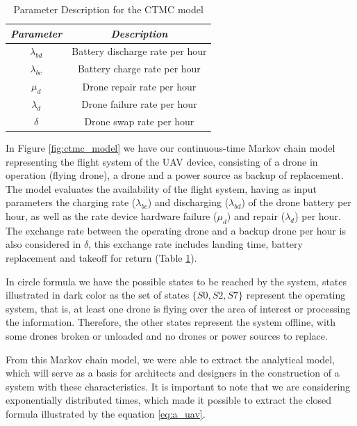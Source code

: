 \documentclass[conference]{IEEEtran}
\begin{document}
\begin{table}[htbp]
\caption{Parameter Description for the CTMC model}
\begin{center}
\begin{tabular}{|c|c|}
\hline
\textbf{\textit{Parameter}}& \textbf{\textit{Description}} \\
\hline
  \(\lambda_{bd}\) & Battery discharge rate per hour \\
  \(\lambda_{bc}\)  & Battery charge rate per hour\\
 \(\mu_{d}\) & Drone repair rate per hour  \\
 \(\lambda_{d}\) & Drone failure rate per hour \\
 \(\delta\) & Drone swap rate per hour \\
\hline
\end{tabular}
\label{tab:ctmc_parameter_description}
\end{center}
\end{table}

In Figure \ref{fig:ctmc_model} we have our continuous-time Markov chain model representing the flight system of the UAV device, consisting of a drone in operation (flying drone), a drone and a power source as backup of replacement. The model evaluates the availability of the flight system, having as input parameters the charging rate ($\lambda_{bc}$) and discharging ($\lambda_{bd}$) of the drone battery per hour, as well as the rate device hardware failure ($\mu_{d}$) and repair ($\lambda_{d}$) per hour. The exchange rate between the operating drone and a backup drone per hour is also considered in $\delta$, this exchange rate includes landing time, battery replacement and takeoff for return (Table \ref{tab:ctmc_parameter_description}).

In circle formula we have the possible states to be reached by the system, states illustrated in dark color as the set of states $\{S0, S2, S7\}$ represent the operating system, that is, at least one drone is flying over the area of interest or processing the information. Therefore, the other states represent the system offline, with some drones broken or unloaded and no drones or power sources to replace.

From this Markov chain model, we were able to extract the analytical model, which will serve as a basis for architects and designers in the construction of a system with these characteristics. It is important to note that we are considering exponentially distributed times, which made it possible to extract the closed formula illustrated by the equation \ref{eq:a_uav}.
\end{document}

